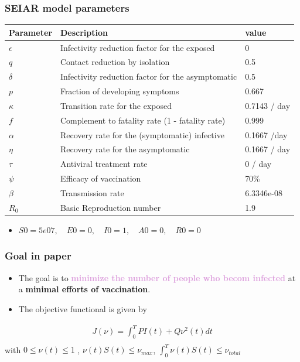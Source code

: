\documentclass[usenames,dvipsnames, aspectratio=169, 9pt]{beamer}
\begin{document}
\begin{frame}\frametitle{SEIAR model parameters}
\begin{table}[]
\begin{tabular}{lll}
\hline
Parameter & Description                                       & value        \\ \hline
$\epsilon$   & Infectivity reduction factor for the exposed      & 0            \\
$q$         & Contact reduction by isolation                    & 0.5          \\
$\delta$     & Infectivity reduction factor for the asymptomatic & 0.5          \\
$p$         & Fraction of developing symptoms                   & 0.667        \\
$\kappa$     & Transition rate for the exposed                   & 0.7143 / day \\
$f$         & Complement to fatality rate (1 - fatality rate)   & 0.999        \\
$\alpha$     & Recovery rate for the (symptomatic) infective     & 0.1667 /day  \\
$\eta$       & Recovery rate for the asymptomatic                & 0.1667 / day \\
$\tau$       & Antiviral treatment rate                          & 0 / day      \\
$\psi$       & Efficacy of vaccination                           & 70\%         \\ 
$\beta$    & Transmission rate                                 & 6.3346e-08           \\
$R_{0}$     & Basic Reproduction number                         & 1.9           \\\hline
\end{tabular}
\end{table}
\begin{itemize}
    \item $S0 = 5e07, \quad E0 = 0, \quad   I0 = 1,   \quad  A0 = 0,  \quad   R0 = 0$
\end{itemize}
\end{frame}


\begin{frame}\frametitle{Goal in paper}
\begin{itemize}
    \item The goal is to \textcolor{Plum}{\textbf{minimize the number of people who becom infected}} at a \textbf{minimal efforts of vaccination}.
    \item The objective functional is given by
\end{itemize}
\begin{align*}
J(\nu) = \int_0^T P I(t) + Q \nu^2(t) dt\\
\end{align*}
with
$0 \leq \nu(t) \leq 1$ , $\nu(t) S(t) \leq \nu_{max}$, $\int_0^T \nu(t) S(t) \leq \nu_{total}$
\end{frame}
\end{document}
